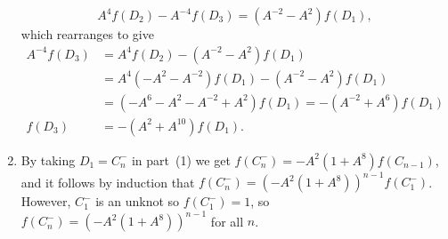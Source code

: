 \documentclass[a4paper]{amsart}
\begin{document}
\begin{solution}
\begin{enumerate}
   \[ A^4 f(D_2) - A^{-4} f(D_3) = (A^{-2} - A^2) f(D_1), \]
   which rearranges to give 
   \begin{align*}
    A^{-4}f(D_3) &= A^4 f(D_2) - (A^{-2} - A^2) f(D_1) \\
     &= A^4(-A^2-A^{-2}) f(D_1) - (A^{-2} - A^2) f(D_1) \\
     &= (-A^6-A^2-A^{-2}+A^2) f(D_1) = -(A^{-2}+A^6) f(D_1) \\
    f(D_3) &= -(A^2+A^{10})f(D_1).
   \end{align*}
  \item By taking $D_1=C_n^-$ in part~(1) we get
   $f(C^-_n)=-A^2(1+A^8)f(C_{n-1})$, and it follows by induction that
   $f(C^-_n)=(-A^2(1+A^8))^{n-1}f(C^-_1)$.  However, $C^-_1$ is an
   unknot so $f(C^-_1)=1$, so $f(C^-_n)=(-A^2(1+A^8))^{n-1}$ for all
   $n$. 
 \end{enumerate}
\end{solution}
\vspace{-2ex}
\end{document}
